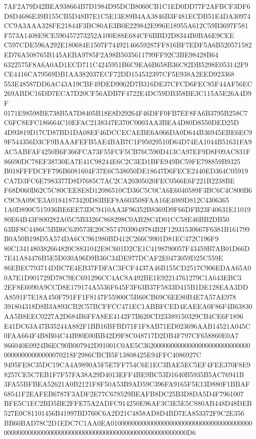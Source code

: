 \documentclass[UTF8,fontset=fandol,zihao=-4,a4paper]{ctexart}
\begin{document}
{{7AF2A79D42BEA938664B7D1984D95DCB8060CB1C1ED0DD77F2AFBCF3DF6D8D4686E39B155CB5D48B7E1C5E13E89B4AA3846B3F481ECDB51E4DA30974
CC9A3AAA328FE21844F3BC80AE3B0E229842E996E18955A612C59B3697F581F573A1408E9CE590457273252A100E88E684CF6BBD2D8344B0BA6E9CEE
C597CDE596A292E180684E1507F74492146659287FF816BF7EDF5A6B520571582ED76A508765B145AEBA9785F2A98B5035611799FF92C3BE98428B64
6322575F8A6A0AD1ECD711C4245951B6C9EA6B658B36C82DB5298E053142F9CE4416CA79569DB1AA382037ECF72DD154532397CF5E938A2EED923368
553E48587DD6AC43A19CBF49DED9062D7B316DE37CFCD6FEC85F44AF56EC269ABDC16DD7ECA7D20CF56ADB7F4722E4DC59DB358BE3C115A5E26A4D9F
0171E98598BE738B5A7D8405B18E8D29264F46DFF0FB7EF8FA6B3795B258C7C6FC8EFC186664C10EFAC2138347E370C0003AA3BEA4D80D8550DED25D
4D93819D17CD87BD1DA08EF46DCCECAEBE6A066DA0D644B36945EBE6EC99F544356D3CF9BAAAFEFB5AE4BAB7C1F95029510D64D74EA1044B51631FA9
AC5ABFAF4250B6F366FCA73F55FCF5CB76C590D413CA97EF9D8F09AC831F86690DC78EF38730EA7E41C98244E6C2C3ED1BFE949BC59FE798859B9325
B018FFFDCFF796B6081604F37E6C538050DE18647D6FECE2440ED364C05919CA7D3FC6E7983377D8D7685C7AC2CA20305020FEC0566E6F221B2238BE
F68D060B62C5C80CEE8E8D12086510CD36C5C0CA6E6040589F3BC6C4C800B6C9C8A09CE3A01841873420D83BEF8A603508FAA16E4089D812C4306365
1A0D890C515936BE6EE73DC9410AA3F96352B8369D9F66DFB23F40631E1101980E64B43F800282A05C5B3326C868298C0AB28C4D01CC58E46BB2DB50
63BF8C4486C5BB6C639573E20C85747039049784B2F12931530667F6381B161799B0A50B198D5A574DA6CC961980BD412C266C9901D81EC472C196F9
80C1341480382664820C8831042E8C601D2CE1C4198790057F43459B7AB01D66D7E41A84476B5E5D030A96D9B36C34DE977DCAF2E0473059D25C559E
86EBEC793714DBC7E4EB37FDFAC3FCF4437A46B155CD2517C906EDAA65A00A7E1D901729D78C9EC691296CC4AC8A492BE1E92214761279C1A643EBC3
2EF8E6090A9CCD8E179174A5536F645F3F63B37F5833D415B1DE128EAA3DDA8591F7E18A450F791FF1F8147F55900C5B60CB69C6EE80B4E7A57AE978
391804318D8B3A893CB2C57BCFFCC471EC1ABBFCED4EAEEA0F86F4B63830AA5B8EEC0227A2D684B6FFA8EE4142F7B620CD23389150329CB4CE6F1896
E41DC63A47B35244A882F1BB16BFBD71F1F8AB71ED023696AAB14521A045C0FAA664F4B8B04C44B90E00BB42D9F8C048717D2DB4F797CF658860E0A7
866040E0924B6EC90B007942D91001C0AE5C362000000000000000000000000000000000000000000070218F2986CBCB5F13808425E94FFC4086927C
9495FE8C35DC19CA4A9890A5F5E7FF754C6E1EC3BAE5EC5EF4FEE370F8E98257CE5C7EB1F7F57FA38A29D4013EFF4BE9BC53D1640B5935B5AC76941B
3FA55BFBEA52621A0B2121F8F50A53B9AD59C396FA9165F5E13D880F1BBAF68541F2EAFEB6787F3ADF2E77C678529BEAFB8DC25B3D8DA5D4F7961007
BFE5C1EC2BD5BE2FFE75A2ADFC914250E96AF3C3E5E5C880AB448D48DEB527E0C81101456B41997BD760C6A2D21C4858AD8D4BD7EA853372F9C2E356
BB60BAD78C2D1EDC7C1AA0EA0100000000000000000000000000000000000000000000000000000000000000000000000000000000000000000000D6
}}
\end{document}
